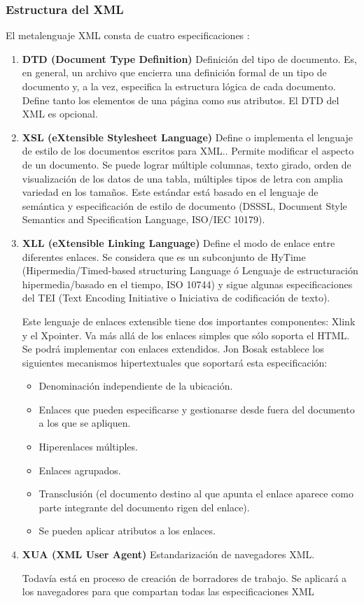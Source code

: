 \subsubsection*{Estructura del XML}

El metalenguaje XML consta de cuatro especificaciones :
\begin{enumerate}[1.]
\item \textbf{DTD (Document Type Definition)} Definición del tipo de documento. Es, en general, un archivo que encierra una definición formal de un tipo de documento y, a la vez, especifica la estructura lógica de cada documento. Define tanto los elementos de una página como sus atributos. El DTD del XML es opcional. 

\item \textbf{XSL (eXtensible Stylesheet Language)} Define o implementa el lenguaje de estilo de los documentos escritos para XML.. Permite modificar el aspecto de un documento.
Se puede lograr múltiple columnas, texto girado, orden de visualización de los datos de una tabla, múltiples tipos de letra con amplia variedad en los tamaños. Este estándar está basado en el lenguaje de semántica y especificación de estilo de documento (DSSSL, Document Style Semantics  and Specification Language, ISO/IEC 10179).

\item \textbf{XLL (eXtensible Linking Language)} Define el modo de enlace entre diferentes enlaces. Se considera que es un subconjunto de HyTime (Hipermedia/Timed-based structuring Language ó Lenguaje de estructuración hipermedia/basado en el tiempo, ISO 10744) y sigue algunas especificaciones del TEI (Text Encoding Initiative o Iniciativa de codificación de texto). 

Este lenguaje de enlaces extensible tiene dos importantes componentes: Xlink y el Xpointer. Va más allá de los enlaces simples que sólo soporta el HTML. Se podrá implementar con enlaces extendidos. Jon Bosak establece los siguientes mecanismos hipertextuales que soportará esta especificación:

\begin{itemize}
	\item Denominación independiente de la ubicación.
	\item Enlaces que pueden especificarse y gestionarse desde fuera del documento a los que se apliquen.
	\item Hiperenlaces múltiples.
	\item Enlaces agrupados.
	\item Transclusión (el documento destino al que apunta el enlace aparece como parte integrante del documento rigen del enlace).
	\item Se pueden aplicar atributos a los enlaces.
\end{itemize}


\item \textbf{XUA (XML User Agent)} Estandarización de navegadores XML.

Todavía está en proceso de creación de borradores de trabajo. Se aplicará a los navegadores para que compartan todas las especificaciones XML
\end{enumerate}

